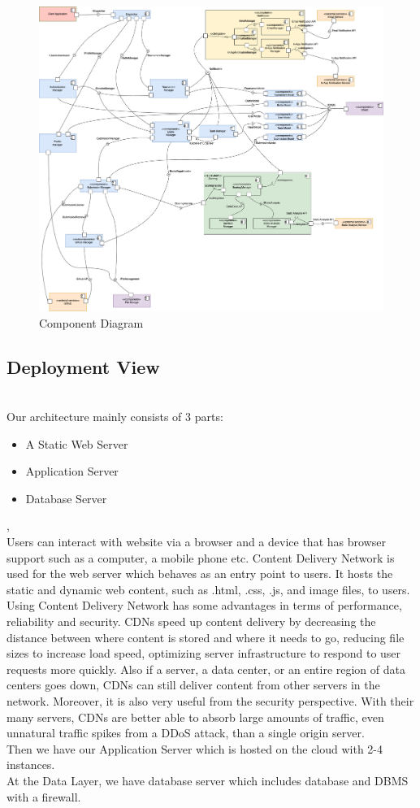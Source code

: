 \begin{figure}[H]
    \centering
    \includegraphics[width=\linewidth]{Images/DD-component.drawio.png}
    \caption{Component Diagram}
\end{figure}



\newpage
\subsection{Deployment View}
\\
\indent Our architecture mainly consists of 3 parts: 
\begin{itemize}
    \item A Static Web Server
    \item Application Server
    \item Database Server
\end{itemize},
\\
Users can interact with website via a browser and a device that has browser support such as a computer, a mobile phone etc. Content Delivery Network is used for the web server which behaves as an entry point to users. It hosts the static and dynamic web content, such as .html, .css, .js, and image files, to users. Using Content Delivery Network has some advantages in terms of performance, reliability and security. CDNs speed up content delivery by decreasing the distance between where content is stored and where it needs to go, reducing file sizes to increase load speed, optimizing server infrastructure to respond to user requests more quickly. Also  if a server, a data center, or an entire region of data centers goes down, CDNs can still deliver content from other servers in the network. Moreover, it is also very useful from the security perspective. With their many servers, CDNs are better able to absorb large amounts of traffic, even unnatural traffic spikes from a DDoS attack, than a single origin server.
\\
\indent Then we have our Application Server which is hosted on the cloud with 2-4 instances. 
\\
\indent At the Data Layer, we have database server which includes database and DBMS with a firewall. 



